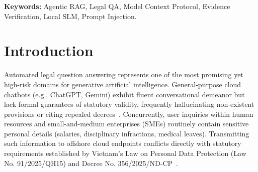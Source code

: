 \documentclass[a4paper,11pt]{article}
\begin{document}
\newpage
\hypersetup{pageanchor=true}
\setcounter{page}{1}

\begin{abstract}
Public commercial large language models frequently produce plausible but ungrounded legal citations, while transmitting sensitive organizational queries across jurisdictional boundaries in violation of emerging data protection frameworks such as Vietnam's Law on Personal Data Protection (PDPL 2025). We present \textbf{LuatCheck}, a local, evidence-grounded agentic assistant designed for privacy-sensitive Vietnamese legal question answering. LuatCheck integrates a budgeted ReAct-style reasoning loop constrained to a five-call budget, a three-tier permissioned toolset adhering to the Model Context Protocol (MCP), a dual-tier memory system with strict validation write policies, and a two-tier evidence verification engine (L1 deterministic provenance check and L2 semantic entailment check). Evaluated on an expanded 20-task benchmark across three independent seeds, LuatCheck drives the unsupported-sentence rate to exactly $0.0\%$, improves citation precision from $0.600$ to $0.750$ ($1.000$ across all 15 answerable tasks), and achieves a $100.0\%$ defense rate against complex prompt injection attacks, all running entirely on local consumer hardware at zero marginal API cost.
\end{abstract}

\vspace{4pt}
\noindent\textbf{Keywords:} Agentic RAG, Legal QA, Model Context Protocol, Evidence Verification, Local SLM, Prompt Injection.

\section{Introduction}

Automated legal question answering represents one of the most promising yet high-risk domains for generative artificial intelligence. General-purpose cloud chatbots (e.g., ChatGPT, Gemini) exhibit fluent conversational demeanor but lack formal guarantees of statutory validity, frequently hallucinating non-existent provisions or citing repealed decrees~\citep{magesh2025hallucination}. Concurrently, user inquiries within human resources and small-and-medium enterprises (SMEs) routinely contain sensitive personal details (salaries, disciplinary infractions, medical leaves). Transmitting such information to offshore cloud endpoints conflicts directly with statutory requirements established by Vietnam's Law on Personal Data Protection (Law No. 91/2025/QH15) and Decree No. 356/2025/ND-CP~\citep{vietnam2025pdpl,decree3562025}.
\end{document}
